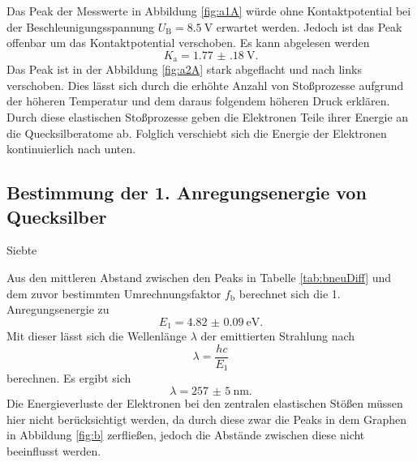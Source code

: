Das Peak der Messwerte in Abbildung \ref{fig:a1A} würde ohne Kontaktpotential bei der Beschleunigungsspannung $U_\text{B}=\SI{8.5}{\volt}$ erwartet werden. Jedoch ist das Peak offenbar um das Kontaktpotential verschoben.
Es kann abgelesen werden
\begin{displaymath}
K_\text{a}=\SI{1.77(18)}{\volt}\text{.}
\end{displaymath}
Das Peak ist in der Abbildung \ref{fig:a2A} stark abgeflacht und nach links verschoben. Dies lässt sich durch die erhöhte Anzahl von Stoßprozesse aufgrund der höheren Temperatur und dem daraus folgendem höheren Druck erklären. Durch diese elastischen Stoßprozesse geben die Elektronen Teile ihrer Energie an die Quecksilberatome ab. Folglich verschiebt sich die Energie der Elektronen kontinuierlich nach unten.


\subsection{Bestimmung der 1. Anregungsenergie von Quecksilber}
\begin{table}
	\caption{Siebte}
	\centering
	
\end{table}
Aus den mittleren Abstand zwischen den Peaks in Tabelle \ref{tab:bneuDiff} und dem zuvor bestimmten Umrechnungsfaktor $f_\text{b}$ berechnet sich die 1. Anregungsenergie zu
\begin{displaymath}
	E_1=\SI{4.82(9)}{\electronvolt}\text{.}
\end{displaymath}
Mit dieser lässt sich die Wellenlänge $\lambda$ der emittierten Strahlung nach
\begin{equation}
\lambda = \frac{h  c}{E_1}
\end{equation}
berechnen.
Es ergibt sich
\begin{displaymath}
\lambda=\SI{257(5)}{\nano\meter}\text{.}
\end{displaymath}
Die Energieverluste der Elektronen bei den zentralen elastischen Stößen müssen hier nicht berücksichtigt werden, da durch diese zwar die Peaks in dem Graphen in Abbildung \ref{fig:b} zerfließen, jedoch die Abstände zwischen diese nicht beeinflusst werden.


